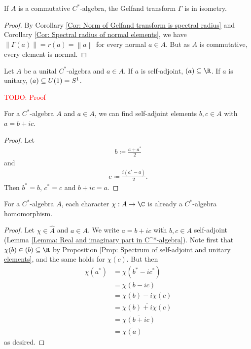 \documentclass[american]{scrartcl}
\newcommand{\todo}[1]{\textcolor{red}{TODO: #1}}
\renewcommand{\norm}[1]{\left\lVert #1 \right\rVert}
\let\sp\relax
\newcommand{\conj}[1]{\overline{#1}}
\begin{document}
\begin{corollary}\label{Cor: Gelfand transform injective}
	If $A$ is a commutative $C^*$-algebra, the Gelfand transform $\Gamma$ is in isometry.
\end{corollary}
\begin{proof}
	By Corollary \ref{Cor: Norm of Gelfand transform is spectral radius} and Corollary \ref{Cor: Spectral radius of normal elements}, we have $\norm{\Gamma(a)}=r(a)=\norm{a}$ for every normal $a\in A$. But as $A$ is commutative, every element is normal.
\end{proof}
\begin{proposition}\label{Prop: Spectrum of self-adjoint and unitary elements}
	Let $A$ be a unital $C^*$-algebra and $a\in A$. If $a$ is self-adjoint, $\sp(a)\subseteq\R$. If $a$ is unitary, $\sp(a)\subseteq U(1)=S^1$.
\end{proposition}
\todo{Proof}
\begin{lemma}\label{Lemma: Real and imaginary part in C^*-algebra}
	For a $C^*$-algebra $A$ and $a\in A$, we can find self-adjoint elements $b,c\in A$ with $a=b+ic$.
\end{lemma}
\begin{proof}
	Let 
	\begin{align*}
		b\coloneqq \frac{a+a^*}{2}
	\end{align*}
	and
	\begin{align*}
		c\coloneqq \frac{i(a^*-a)}{2}.
	\end{align*}
	Then $b^*=b$, $c^*=c$ and $b+ic=a$.
\end{proof}
\begin{lemma}\label{Lemma: Characters are *-homomorphisms}
	For a $C^*$-algebra $A$, each character $\chi:A\to \C$ is already a $C^*$-algebra homomorphism.
\end{lemma}
\begin{proof}
	Let $\chi\in \hat{A}$ and $a\in A$. We write $a=b+ic$ with $b,c\in A$ self-adjoint (Lemma \ref{Lemma: Real and imaginary part in C^*-algebra}). Note first that $\chi(b)\in\sp(b)\subseteq \R$ by Proposition \ref{Prop: Spectrum of self-adjoint and unitary elements}, and the same holds for $\chi(c)$. But then
	\begin{align*}
		\chi(a^*)&=\chi(b^*-ic^*)\\
		&=\chi(b-ic)\\
		&=\chi(b)-i\chi(c)\\
		&=\conj{\chi(b)+i\chi(c)}\\
		&=\conj{\chi(b+ic)}\\
		&=\conj{\chi(a)}
	\end{align*}
	as desired.
\end{proof}
\end{document}
